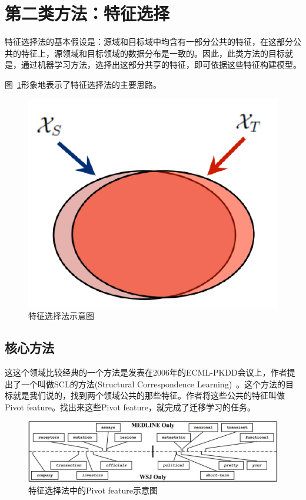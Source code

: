 \newpage

\section{第二类方法：特征选择}

特征选择法的基本假设是：源域和目标域中均含有一部分公共的特征，在这部分公共的特征上，源领域和目标领域的数据分布是一致的。因此，此类方法的目标就是，通过机器学习方法，选择出这部分共享的特征，即可依据这些特征构建模型。

图~\ref{fig-feature}形象地表示了特征选择法的主要思路。

\begin{figure}[htbp]
	\centering
	\includegraphics[scale=0.5]{./figures/fig-feature.pdf}
	\caption{特征选择法示意图}
	\label{fig-feature}
\end{figure}

\subsection{核心方法}

这这个领域比较经典的一个方法是发表在2006年的ECML-PKDD会议上，作者提出了一个叫做SCL的方法(Structural Correspondence Learning)~\cite{blitzer2006domain}。这个方法的目标就是我们说的，找到两个领域公共的那些特征。作者将这些公共的特征叫做Pivot feature。找出来这些Pivot feature，就完成了迁移学习的任务。

\begin{figure}[htbp]
	\centering
	\includegraphics[scale=0.3]{./figures/fig-feature-pivot.pdf}
	\caption{特征选择法中的Pivot feature示意图}
	\label{fig-feature-pivot}
\end{figure}

